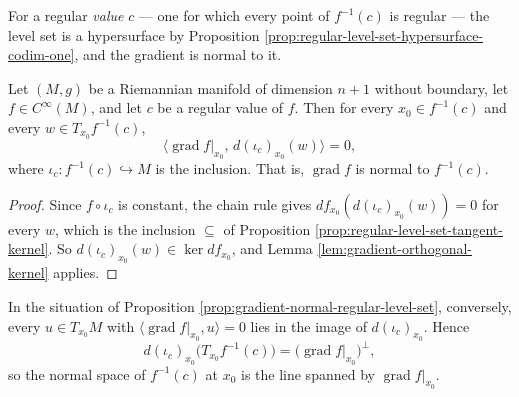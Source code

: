 For a regular \emph{value} $c$ — one for which every point of $f^{-1}(c)$ is regular — the level set is a hypersurface by Proposition \ref{prop:regular-level-set-hypersurface-codim-one}, and the gradient is normal to it.

\begin{proposition}
\label{prop:gradient-normal-regular-level-set}
\leanok
{}
Let $(M,g)$ be a Riemannian manifold of dimension $n+1$ without boundary, let $f \in C^\infty(M)$, and let $c$ be a regular value of $f$. Then for every $x_0 \in f^{-1}(c)$ and every $w \in T_{x_0} f^{-1}(c)$,
\[
  \bigl\langle \operatorname{grad} f|_{x_0},\, d(\iota_c)_{x_0}(w) \bigr\rangle = 0 ,
\]
where $\iota_c : f^{-1}(c) \hookrightarrow M$ is the inclusion. That is, $\operatorname{grad} f$ is normal to $f^{-1}(c)$.
\end{proposition}

\begin{proof}
\leanok
{}
Since $f \circ \iota_c$ is constant, the chain rule gives $df_{x_0}(d(\iota_c)_{x_0}(w)) = 0$ for every $w$, which is the inclusion $\subseteq$ of Proposition \ref{prop:regular-level-set-tangent-kernel}. So $d(\iota_c)_{x_0}(w) \in \ker df_{x_0}$, and Lemma \ref{lem:gradient-orthogonal-kernel} applies.
\end{proof}

\begin{proposition}
\label{prop:tangent-space-regular-level-set-gradient-orthogonal}
\leanok
{}
In the situation of Proposition \ref{prop:gradient-normal-regular-level-set}, conversely, every $u \in T_{x_0} M$ with $\langle \operatorname{grad} f|_{x_0}, u\rangle = 0$ lies in the image of $d(\iota_c)_{x_0}$. Hence
\[
  d(\iota_c)_{x_0}\bigl(T_{x_0} f^{-1}(c)\bigr) = \bigl(\operatorname{grad} f|_{x_0}\bigr)^{\perp} ,
\]
so the normal space of $f^{-1}(c)$ at $x_0$ is the line spanned by $\operatorname{grad} f|_{x_0}$.
\end{proposition}

